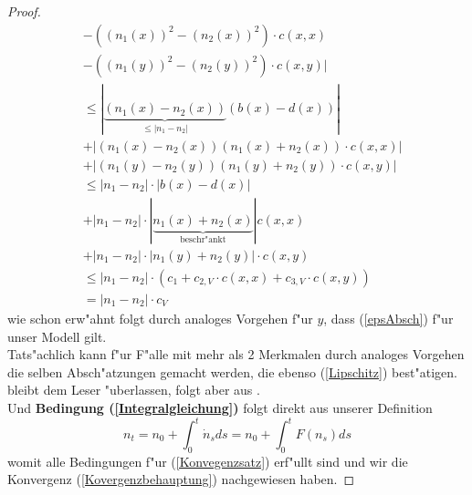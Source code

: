 \documentclass[11pt,a4paper]{article}
\theoremstyle{plain}
\begin{document}
\begin{proof}
\begin{align*}
		& - ((n_1(x))^2 - (n_2(x))^2) \cdot c(x,x)\\
		& - ((n_1(y))^2 - (n_2(y))^2) \cdot c(x,y) |\\
		& \le  |\underbrace{(n_1(x) - n_2(x))}_{ \le |n_1 - n_2|}(b(x) - d(x)) |\\
		& + | (n_1(x) - n_2(x))(n_1(x) + n_2(x)) \cdot c(x,x) | \\
		& + | (n_1(y) - n_2(y))(n_1(y) + n_2(y)) \cdot c(x,y) |\\
		& \le |n_1 - n_2| \cdot | b(x) - d(x) | \\
		& +  |n_1 - n_2| \cdot |\underbrace{n_1(x) + n_2(x)}_{\text{beschr"ankt}}| c(x,x) \\
		& + |n_1 - n_2| \cdot | n_1(y) + n_2(y) | \cdot c(x,y)\\
		& \le |n_1 - n_2| \cdot ( c_1 + c_{2,V} \cdot c(x,x) + c_{3,V} \cdot c(x,y) )\\
		& = |n_1 - n_2| \cdot c_V
	\end{align*}
	wie schon erw"ahnt folgt durch analoges Vorgehen f"ur $ y $, dass (\ref{epsAbsch}) f"ur unser Modell gilt.\\ 
	Tats"achlich kann f"ur F"alle mit mehr als 2 Merkmalen durch analoges Vorgehen die selben Absch"atzungen gemacht werden, die ebenso (\ref{Lipschitz}) best"atigen.\\
	
	\cite[Kapitel 11 - \textbf{(2.3)}]{ethier2009markov} bleibt dem Leser "uberlassen, folgt aber aus \cite[Kapitel 6 - (2.1)]{ethier2009markov}.\\
	Und \textbf{Bedingung (\ref{Integralgleichung})} folgt direkt aus unserer Definition
	\[ n_t = n_0 + \int_{0}^{t} \dot{n}_s ds = n_0 + \int_{0}^{t} F(n_s) ds \]
	womit alle Bedingungen f"ur (\ref{Konvegenzsatz}) erf"ullt sind und wir die Konvergenz (\ref{Kovergenzbehauptung}) nachgewiesen haben.
\end{proof}
	

\end{document}
